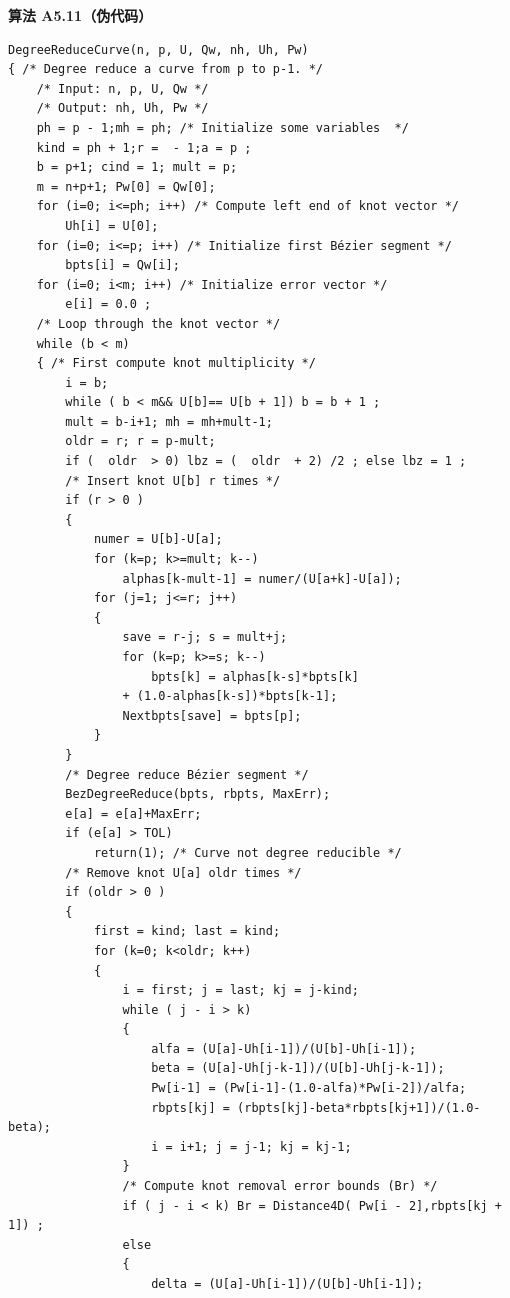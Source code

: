 \documentclass[../main.tex]{subfiles}
\begin{document}
\par\medskip\noindent\textbf{算法 A5.11（伪代码）}\par
\begin{verbatim}
DegreeReduceCurve(n, p, U, Qw, nh, Uh, Pw)
{ /* Degree reduce a curve from p to p-1. */
    /* Input: n, p, U, Qw */
    /* Output: nh, Uh, Pw */
    ph = p - 1;mh = ph; /* Initialize some variables  */
    kind = ph + 1;r =  - 1;a = p ;
    b = p+1; cind = 1; mult = p;
    m = n+p+1; Pw[0] = Qw[0];
    for (i=0; i<=ph; i++) /* Compute left end of knot vector */
        Uh[i] = U[0];
    for (i=0; i<=p; i++) /* Initialize first Bézier segment */
        bpts[i] = Qw[i];
    for (i=0; i<m; i++) /* Initialize error vector */
        e[i] = 0.0 ;
    /* Loop through the knot vector */
    while (b < m)
    { /* First compute knot multiplicity */
        i = b;
        while ( b < m&& U[b]== U[b + 1]) b = b + 1 ;
        mult = b-i+1; mh = mh+mult-1;
        oldr = r; r = p-mult;
        if (  oldr  > 0) lbz = (  oldr  + 2) /2 ; else lbz = 1 ;
        /* Insert knot U[b] r times */
        if (r > 0 )
        {
            numer = U[b]-U[a];
            for (k=p; k>=mult; k--)
                alphas[k-mult-1] = numer/(U[a+k]-U[a]);
            for (j=1; j<=r; j++)
            {
                save = r-j; s = mult+j;
                for (k=p; k>=s; k--)
                    bpts[k] = alphas[k-s]*bpts[k]
                + (1.0-alphas[k-s])*bpts[k-1];
                Nextbpts[save] = bpts[p];
            }
        }
        /* Degree reduce Bézier segment */
        BezDegreeReduce(bpts, rbpts, MaxErr);
        e[a] = e[a]+MaxErr;
        if (e[a] > TOL)
            return(1); /* Curve not degree reducible */
        /* Remove knot U[a] oldr times */
        if (oldr > 0 )
        {
            first = kind; last = kind;
            for (k=0; k<oldr; k++)
            {
                i = first; j = last; kj = j-kind;
                while ( j - i > k)
                {
                    alfa = (U[a]-Uh[i-1])/(U[b]-Uh[i-1]);
                    beta = (U[a]-Uh[j-k-1])/(U[b]-Uh[j-k-1]);
                    Pw[i-1] = (Pw[i-1]-(1.0-alfa)*Pw[i-2])/alfa;
                    rbpts[kj] = (rbpts[kj]-beta*rbpts[kj+1])/(1.0-beta);
                    i = i+1; j = j-1; kj = kj-1;
                }
                /* Compute knot removal error bounds (Br) */
                if ( j - i < k) Br = Distance4D( Pw[i - 2],rbpts[kj + 1]) ;
                else
                {
                    delta = (U[a]-Uh[i-1])/(U[b]-Uh[i-1]);

\end{verbatim}
\end{document}
